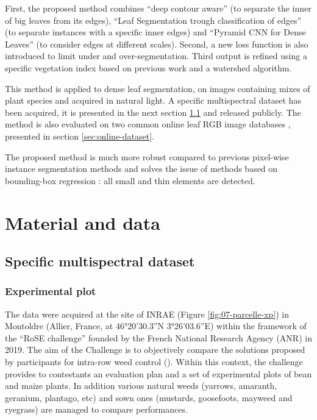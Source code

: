 \documentclass[../thesis.tex]{subfiles}
\begin{document}
    First, the proposed method combines ``deep contour aware'' (to separate the inner of big leaves from its edges), ``Leaf Segmentation trough classification of edges'' (to separate instances with a specific inner edges) and ``Pyramid CNN for Dense Leaves'' (to consider edges at different scales). Second, a new loss function is also introduced to limit under and over-segmentation. Third output is refined using a specific vegetation index based on previous work \cite{Vayssade2021} and a watershed algorithm. 
    
    This method is applied to dense leaf segmentation, on images containing mixes of plant species and acquired in natural light. A specific multispectral dataset has been acquired, it is presented in the next section \ref{sec:Airphen-dataset} and released publicly. The method is also evaluated on two common online leaf RGB image databases \cite{scharr2016leaf}, presented in section \ref{sec:online-dataset}. 
    
    The proposed method is much more robust compared to previous pixel-wise instance segmentation methods and solves the issue of methods based on bounding-box regression : all small and thin elements are detected.
    
    \newpage
    \section{Material and data}
    
    
    \subsection{Specific multispectral dataset}
    \label{sec:Airphen-dataset}
    \subsubsection{Experimental plot}
    
    The data were acquired at the site of INRAE (Figure \ref{fig:07-parcelle-xp}) in Montoldre (Allier, France, at 46°20'30.3”N 3°26'03.6”E) within the framework of the “RoSE challenge” founded by the French National Research Agency (ANR) in 2019. The aim of the Challenge is to objectively compare the solutions proposed by participants for intra-row weed control (\cite{ChallengeRoSE}). Within this context, the challenge provides to contestants an evaluation plan and a set of experimental plots of bean and maize plants. In addition various natural weeds (yarrows, amaranth, geranium, plantago, etc) and sown ones (mustards, goosefoots, mayweed and ryegrass) are managed to compare performances.
    
\end{document}

